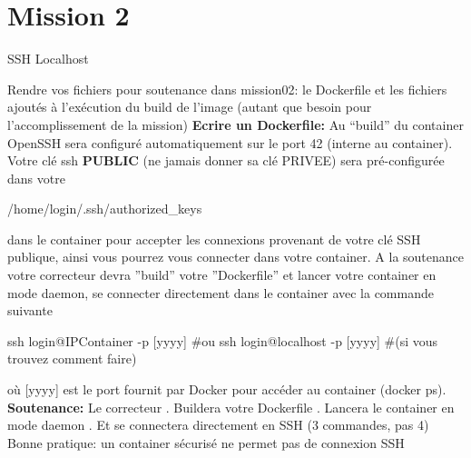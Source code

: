 \documentclass{42}
\begin{document}
	\newpage

\section{Mission 2}
\begin{center}
	{\Huge SSH Localhost}
\end{center}

Rendre vos fichiers pour soutenance dans mission02: le Dockerfile et les fichiers ajoutés à l’exécution du build de l’image (autant que besoin pour l’accomplissement de la mission)
\newline
\newline
\textbf{Ecrire un Dockerfile:}
\newline
Au “build” du container OpenSSH sera configuré automatiquement sur le port 42 (interne au container).
\newline
\newline
Votre clé ssh \textbf{PUBLIC} (ne jamais donner sa clé PRIVEE) sera pré-configurée dans votre
\begin{42ccode}
/home/login/.ssh/authorized_keys
\end{42ccode}
dans le container pour accepter les connexions provenant de votre clé SSH publique, ainsi vous pourrez vous connecter dans votre container.
\newline
\newline
A la soutenance votre correcteur devra ''build'' votre ''Dockerfile'' et lancer votre container en mode daemon, se connecter directement dans le container avec la commande suivante
\begin{42ccode}
ssh login@IPContainer -p [yyyy] #ou
ssh login@localhost -p [yyyy] #(si vous trouvez comment faire)
\end{42ccode}
où [yyyy] est le port fournit par Docker pour accéder au container (docker ps).
\newline
\newline
\textbf{Soutenance:}
\newline
\newline
Le correcteur
. Buildera votre Dockerfile
. Lancera le container en mode daemon
. Et se connectera directement en SSH
\newline
(3 commandes, pas 4)
\newline
\newline
\info
{
	Bonne pratique: un container sécurisé ne permet pas de connexion SSH
}
\end{document}
